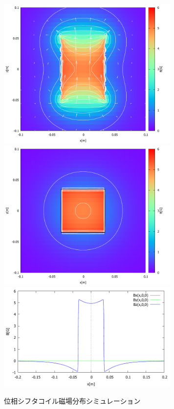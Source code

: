 \begin{figure}[H]
\begin{center}
\includegraphics[width=9cm]{discussion/B/coil11_image1.pdf}
\vspace{-1mm}
\vspace{-3mm}
\includegraphics[width=9cm]{discussion/B/coil11_image2.pdf}
\vspace{-1mm}
\vspace{-3mm}
\includegraphics[width=9cm]{discussion/B/coil11_danmen1.pdf}
\vspace{-1mm}
\vspace{-3mm}
\end{center}
\caption{位相シフタコイル磁場分布シミュレーション} \label{Discussion_fig_PhaseShifterSimulation}
\end{figure}

